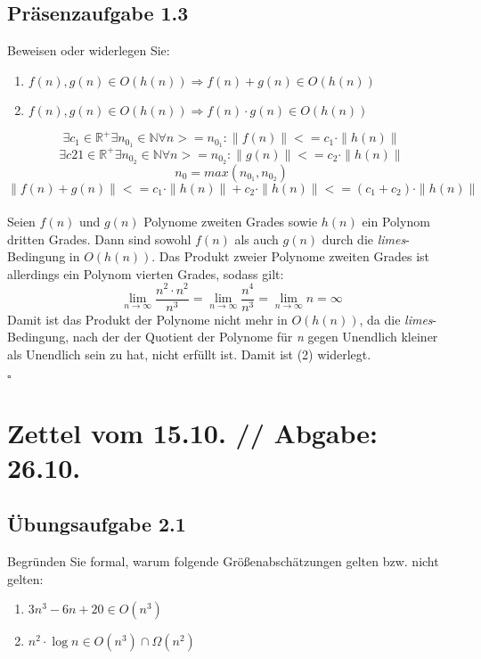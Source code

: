 \documentclass{article}
\begin{document}
\subsection{Präsenzaufgabe 1.3}
Beweisen oder widerlegen Sie:
\begin{enumerate}
	\item $ f(n),g(n) \in O(h(n)) \Rightarrow f(n)+g(n) \in O(h(n)) $
	\item $ f(n),g(n) \in O(h(n)) \Rightarrow f(n) \cdot g(n) \in O(h(n)) $
\end{enumerate}
\vspace{1cm}
\[
	\exists c_1 \in \mathbb{R}^+ \exists n_{0_1} \in \mathbb{N} \forall n >= n_{0_1} : \|f(n)\| <= c_1 \cdot \|h(n)\|
\]
\[
	\exists c21 \in \mathbb{R}^+ \exists n_{0_2} \in \mathbb{N} \forall n >= n_{0_2} : \|g(n)\| <= c_2 \cdot \|h(n)\|
\]
\[
	n_0 = max(n_{0_1},n_{0_2})
\]
\[
	\|f(n)+g(n)\| <= c_1\cdot\|h(n)\|+c_2\cdot\|h(n)\| <= (c_1+c_2)\cdot\|h(n)\|
\]
\vspace{0.5cm}\\
Seien $f(n)$ und $g(n)$ Polynome zweiten Grades sowie $h(n)$ ein Polynom dritten Grades.
Dann sind sowohl $f(n)$ als auch $g(n)$ durch die \textit{limes}-Bedingung in $O(h(n))$.
Das Produkt zweier Polynome zweiten Grades ist allerdings ein Polynom vierten Grades, sodass gilt:
\begin{equation*}
	\lim_{n\rightarrow\infty}\frac{n^2 \cdot n^2}{n^3}=\lim_{n\rightarrow\infty}\frac{n^4}{n^3}=\lim_{n\rightarrow\infty}n=\infty
\end{equation*}
Damit ist das Produkt der Polynome nicht mehr in $O(h(n))$, da die \textit{limes}-Bedingung, nach der der Quotient der Polynome für \textit{n} gegen Unendlich kleiner als Unendlich sein zu hat, nicht erfüllt ist.
Damit ist (2) widerlegt.
\begin{flushright}
$\square$
\end{flushright}
\newpage
\section{Zettel vom 15.10. // Abgabe: 26.10.}
\subsection{Übungsaufgabe 2.1}
\begin{flushright}
\begin{Large}
[~~~~\string| ~~2~]
\end{Large}
\end{flushright}
Begründen Sie formal, warum folgende Größenabschätzungen gelten bzw. nicht gelten:
\begin{enumerate}
	\item $3n^3-6n+20 \in O(n^3)$
	\item $n^2 \cdot \operatorname{log} n \in O(n^3) \cap \Omega(n^2)$
\end{enumerate}
\vspace{1cm}
\end{document}
